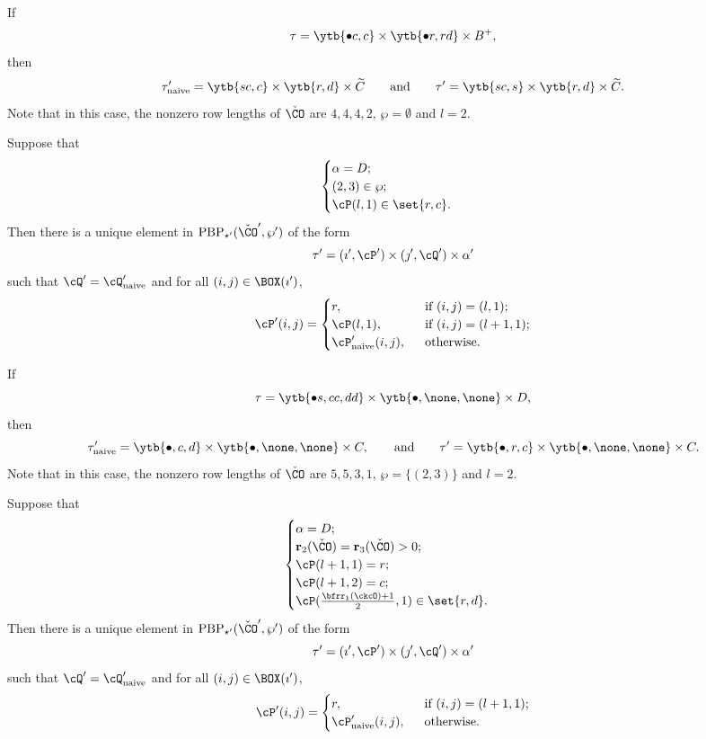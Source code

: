 \documentclass[ssunip]{subfiles}
\begin{document}
\begin{Example}
 If 
 \[
 \tau= \ytb{\bullet c, c} \times \ytb{\bullet r, rd}\times 
  B^+,
 \]
 then 
\[
 \tau'_{\mathrm{naive}}= \ytb{s c, c} \times \ytb{r, d}\times 
  \widetilde C\qquad\textrm{and}\qquad \tau'= \ytb{s c, s} \times \ytb{r, d}\times 
  \widetilde C.
 \]
 Note that in this case, the nonzero row lengths of $\check \CO$ are $4,4,4,2$, $\wp=\emptyset$ and $l=2$.
\end{Example}

\begin{lem}\label{descd1}
  Suppose that 
  \[  \begin{cases}
 \alpha = D; & \\
 (2,3)\in \wp;\quad  &\\
 \cP(l,1)\in \set{r,c}.
\end{cases}
\]
 Then there is a unique element in $\mathrm{PBP}_{\star'}(\check \CO',\wp')$ of the form
  \[
      \tau'=(\imath', \cP')\times (\jmath', \cQ')\times \alpha'
  \]
  such that $\cQ'=\cQ'_{\mathrm{naive}}$ and  for all $(i,j)\in \BOX(\imath')$, 
  \[
\cP'(i,j) = \begin{cases}
  r, & \ \text{ if } (i,j) = (l,1); \\
  \cP(l,1), &\  \text{ if } (i,j) = (l+1,1);\\
  \cP'_{\mathrm{naive}}(i,j), & \ \text{ otherwise}.
\end{cases}
\]
   
\end{lem}




\begin{Example}
 If 
 \[
 \tau= \ytb{\bullet s,  c c, d d} \times \ytb{\bullet,\none, \none }\times 
  D,
 \]
 then 
\[
 \tau'_{\mathrm{naive}}=  \ytb{\bullet,  c,  d}  \times  \ytb{\bullet,\none, \none }\times 
  C,\qquad\textrm{and}\qquad \tau'= \ytb{\bullet, r, c}  \times  \ytb{\bullet,\none, \none }\times
  C.
 \]
 Note that in this case, the nonzero row lengths of $\check \CO$ are $5,5,3,1$,  $\wp=\{(2,3)\}$ and $l=2$.
\end{Example}

\begin{lem}\label{descd2}
  Suppose that 
  \[  \begin{cases}
 \alpha = D; & \\
\mathbf r_2(\check \CO)=\mathbf r_3(\check \CO)>0;  &\\
\cP(l+1,1)=r; &\\
\cP(l+1,2)=c; &\\
 \cP(\frac{\bfrr_1(\ckcO)+1}{2},1)\in \set{r,d}.
\end{cases}
\]
 Then there is a unique element in $\mathrm{PBP}_{\star'}(\check \CO',\wp')$ of the form
  \[
      \tau'=(\imath', \cP')\times (\jmath', \cQ')\times \alpha'
  \]
  such that $\cQ'=\cQ'_{\mathrm{naive}}$ and  for all $(i,j)\in \BOX(\imath')$, 
  \[
\cP'(i,j) = \begin{cases}
  r, & \ \text{ if } (i,j) = (l+1,1); \\
  \cP'_{\mathrm{naive}}(i,j), & \ \text{ otherwise}.
\end{cases}
\]
   
\end{lem}
\end{document}
